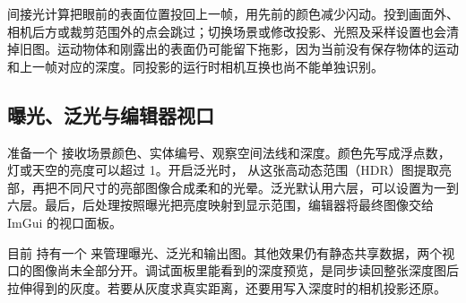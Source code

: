 间接光计算把眼前的表面位置投回上一帧，用先前的颜色减少闪动。投到画面外、相机后方或裁剪范围外的点会跳过；切换场景或修改投影、光照及采样设置也会清掉旧图。运动物体和刚露出的表面仍可能留下拖影，因为当前没有保存物体的运动和上一帧对应的深度。同投影的运行时相机互换也尚不能单独识别。

\subsection{曝光、泛光与编辑器视口}
 准备一个  接收场景颜色、实体编号、观察空间法线和深度。颜色先写成浮点数，灯或天空的亮度可以超过 1。开启泛光时， 从这张高动态范围（HDR）图提取亮部，再把不同尺寸的亮部图像合成柔和的光晕。泛光默认用六层，可以设置为一到六层。最后，后处理按照曝光把亮度映射到显示范围，编辑器将最终图像交给 ImGui 的视口面板。

目前  持有一个  来管理曝光、泛光和输出图。其他效果仍有静态共享数据，两个视口的图像尚未全部分开。调试面板里能看到的深度预览，是同步读回整张深度图后拉伸得到的灰度。若要从灰度求真实距离，还要用写入深度时的相机投影还原。
